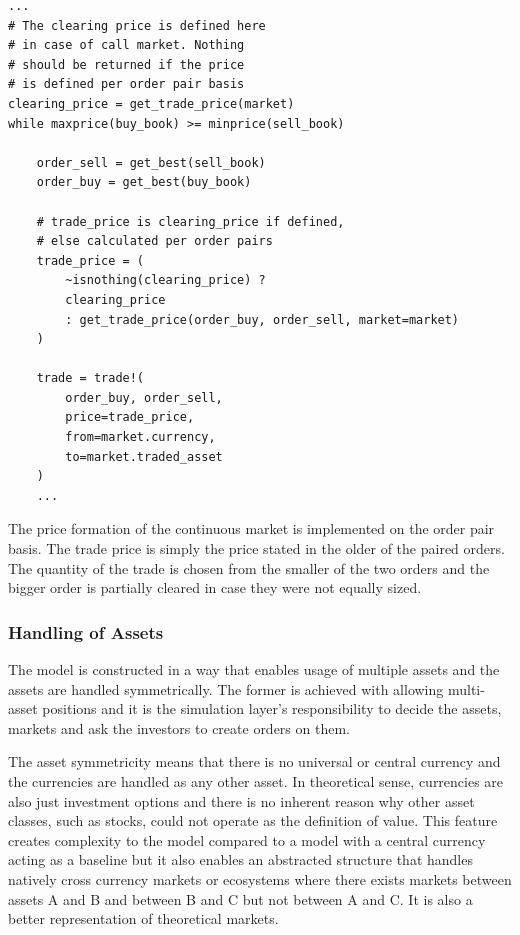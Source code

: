 \begin{lstlisting}[caption={Clearing process},label={lst:clearing}]
...
# The clearing price is defined here
# in case of call market. Nothing
# should be returned if the price
# is defined per order pair basis
clearing_price = get_trade_price(market)
while maxprice(buy_book) >= minprice(sell_book)

    order_sell = get_best(sell_book)
    order_buy = get_best(buy_book)
    
    # trade_price is clearing_price if defined,
    # else calculated per order pairs
    trade_price = (
        ~isnothing(clearing_price) ? 
        clearing_price
        : get_trade_price(order_buy, order_sell, market=market)
    )

    trade = trade!(
        order_buy, order_sell, 
        price=trade_price, 
        from=market.currency, 
        to=market.traded_asset
    )
    ...
\end{lstlisting}

The price formation of the continuous market is implemented
on the order pair basis. The trade price is simply the price
stated in the older of the paired orders. %
The quantity of the trade is chosen from the smaller of the two orders
and the bigger order is partially cleared in case they were not 
equally sized.



\subsubsection{Handling of Assets}

The model is constructed in a way that enables usage of multiple assets
and the assets are handled symmetrically. The former is achieved with
allowing multi-asset positions and it is the simulation layer's 
responsibility to decide the assets, markets and ask the investors
to create orders on them.

The asset symmetricity means that there is no universal or central currency 
and the currencies are handled as any other asset. In theoretical sense, 
currencies are also just investment options and there is no inherent reason why other 
asset classes, such as stocks, could not operate as the definition 
of value. This feature creates complexity to the model compared to a model
with a central currency acting as a baseline but it also enables an
abstracted structure that handles natively cross currency
markets or ecosystems where there exists markets between assets A and 
B and between B and C but not between A and C. It is also a better 
representation of theoretical markets.

